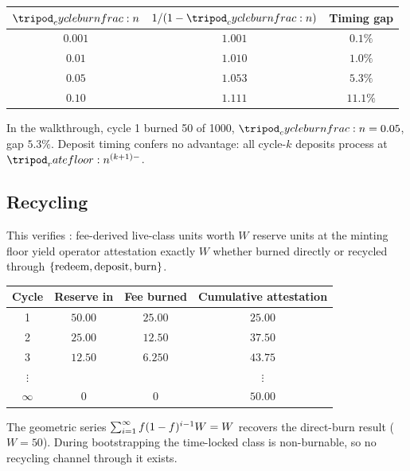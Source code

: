 \documentclass[../main.tex]{subfiles}
\begin{document}
\begin{center}
\begin{tabular}{@{}c c c@{}}
    \toprule
    $\cycleburnfrac{}$ & $1/(1-\cycleburnfrac{})$ & Timing gap \\
    \midrule
    $0.001$ & $1.001$ & $0.1\%$ \\
    $0.01$  & $1.010$ & $1.0\%$ \\
    $0.05$  & $1.053$ & $5.3\%$ \\
    $0.10$  & $1.111$ & $11.1\%$ \\
    \bottomrule
\end{tabular}
\end{center}

In the walkthrough, cycle 1 burned 50 of 1000, $\cycleburnfrac{} = 0.05$, gap $5.3\%$.
Deposit timing confers no advantage: all cycle-$k$ deposits process at
$\ratefloor{}^{(k+1)-}$.

\subsection{Recycling}
\label{sec:verification:recycling}

This verifies : fee-derived live-class units
worth $W$ reserve units at the minting floor yield operator attestation exactly $W$ whether
burned directly or recycled through $\lbrace\text{redeem}, \text{deposit}, \text{burn}\rbrace$.

\begin{center}
\begin{tabular}{@{}c c c c@{}}
    \toprule
    \textbf{Cycle} & \textbf{Reserve in} & \textbf{Fee burned} & \textbf{Cumulative attestation} \\
    \midrule
    1        & $50.00$  & $25.00$ & $25.00$ \\
    2        & $25.00$  & $12.50$ & $37.50$ \\
    3        & $12.50$  & $6.250$ & $43.75$ \\
    $\vdots$ &          &         & $\vdots$ \\
    $\infty$ & $0$      & $0$     & $50.00$ \\
    \bottomrule
\end{tabular}
\end{center}

The geometric series $\sum_{i=1}^{\infty} f(1-f)^{i-1}W = W$ recovers the
direct-burn result ($W = 50$). During bootstrapping the time-locked class is non-burnable,
so no recycling channel through it exists.
\end{document}
